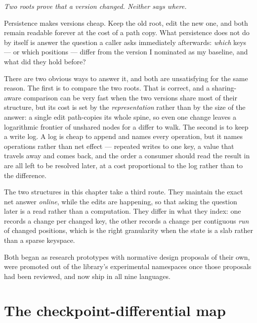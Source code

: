 \documentclass[11pt,twoside,openright]{book}
\newcommand{\motto}[1]{%
  \begingroup
  \vspace{-4pt}\hfill\begin{minipage}{0.80\textwidth}
    \raggedleft\itshape\color{d7slate}\small #1\par
  \end{minipage}\par\vspace{18pt}
  \endgroup}
\begin{document}
\motto{Two roots prove that a version changed. Neither says where.}

\noindent
Persistence makes versions cheap. Keep the old root, edit the new one, and both
remain readable forever at the cost of a path copy. What persistence does not do
by itself is answer the question a caller asks immediately afterwards:
\emph{which} keys --- or which positions --- differ from the version I nominated
as my baseline, and what did they hold before?

There are two obvious ways to answer it, and both are unsatisfying for the same
reason. The first is to compare the two roots. That is correct, and a
sharing-aware comparison can be very fast when the two versions share most of
their structure, but its cost is set by the \emph{representation} rather than by
the size of the answer: a single edit path-copies its whole spine, so even one
change leaves a logarithmic frontier of unshared nodes for a differ to walk. The
second is to keep a write log. A log is cheap to append and names every
operation, but it names operations rather than net effect --- repeated writes to
one key, a value that travels away and comes back, and the order a consumer
should read the result in are all left to be resolved later, at a cost
proportional to the log rather than to the difference.

The two structures in this chapter take a third route. They maintain the exact
net answer \emph{online}, while the edits are happening, so that asking the
question later is a read rather than a computation. They differ in what they
index: one records a change per changed key, the other records a change per
contiguous \emph{run} of changed positions, which is the right granularity when
the state is a slab rather than a sparse keyspace.

Both began as research prototypes with normative design proposals of their own,
were promoted out of the library's experimental namespaces once those proposals
had been reviewed, and now ship in all nine languages.

\section{The checkpoint-differential map}
\end{document}
